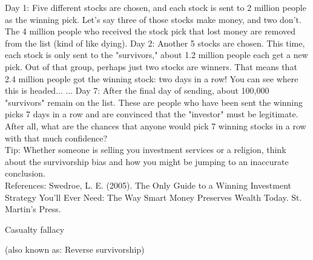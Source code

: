 \documentclass[a4paper,12pt,single,pdftex]{scrartcl}
\begin{document}
    
      Day 1: Five different stocks are chosen, and each stock is sent to 2 million people as the winning pick. Let's say three of those stocks make money, and two don't. The 4 million people who received the stock pick that lost money are removed from the list (kind of like dying). \newline
 \newline
Day 2: Another 5 stocks are chosen. This time, each stock is only sent to the "survivors," about 1.2 million people each get a new pick. Out of that group, perhaps just two stocks are winners. That means that 2.4 million people got the winning stock: two days in a row! You can see where this is headed... \newline
 \newline
... \newline
 \newline
Day 7: After the final day of sending, about 100,000 "survivors" remain on the list. These are people who have been sent the winning picks 7 days in a row and are convinced that the "investor" must be legitimate. After all, what are the chances that anyone would pick 7 winning stocks in a row with that much confidence?
    \\

    
      Tip: Whether someone is selling you investment services or a religion, think about the survivorship bias and how you might be jumping to an inaccurate conclusion.
    \\

    References: Swedroe, L. E. (2005). The Only Guide to a Winning Investment Strategy You’ll Ever Need: The Way Smart Money Preserves Wealth Today. St. Martin’s Press.
  

Casualty fallacy
    
      (also known as: Reverse survivorship)
    \\
\end{document}
